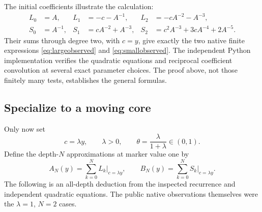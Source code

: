 \documentclass[11pt,letterpaper]{article}
\theoremstyle{remark}\newtheorem{remark}[theorem]{Remark}
\begin{document}
The initial coefficients illustrate the calculation:
\begin{align*}
 L_0&=A,& L_1&=-c-A^{-1},& L_2&=-cA^{-2}-A^{-3},\\
 S_0&=A^{-1},& S_1&=cA^{-2}+A^{-3},&
 S_2&=c^2A^{-3}+3cA^{-4}+2A^{-5}.
\end{align*}
Their sums through degree two, with $c=y$, give exactly the two native finite
expressions \eqref{eq:largeobserved} and \eqref{eq:smallobserved}.
The independent Python implementation verifies the quadratic equations and
reciprocal coefficient convolution at several exact parameter choices. The
proof above, not those finitely many tests, establishes the general formulas.

\subsection{Specialize to a moving core}
Only now set
\begin{equation}\label{eq:theta}
 c=\lambda y,\qquad \lambda>0,\qquad
 \theta=\frac{\lambda}{1+\lambda}\in(0,1).
\end{equation}
Define the depth-$N$ approximations at marker value one by
\[
 A_N(y)=\sum_{k=0}^{N}L_k\big|_{c=\lambda y},\qquad
 B_N(y)=\sum_{k=0}^{N}S_k\big|_{c=\lambda y}.
\]
The following is an all-depth deduction from the inspected recurrence and
independent quadratic equations. The public native observations themselves
were the $\lambda=1$, $N=2$ cases.
\end{document}
